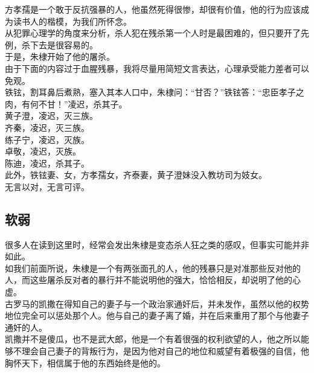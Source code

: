 \begin{multicols}{\theparacolNo}
方孝孺是一个敢于反抗强暴的人，他虽然死得很惨，却很有价值，他的行为应该成为读书人的楷模，为我们所怀念。\\

从犯罪心理学的角度来分析，杀人犯在残杀第一个人时是最困难的，但只要开了先例，杀下去是很容易的。\\

于是，朱棣开始了他的屠杀。\\

由于下面的内容过于血腥残暴，我将尽量用简短文言表达，心理承受能力差者可以免观。\\

铁铉，割耳鼻后煮熟，塞入其本人口中，朱棣问：“甘否？”铁铉答：“忠臣孝子之肉，有何不甘！”凌迟，杀其子。\\

黄子澄，凌迟，灭三族。\\

齐秦，凌迟，灭三族。\\

练子宁，凌迟，灭族。\\

卓敬，凌迟，灭族。\\

陈迪，凌迟，杀其子。\\

此外，铁铉妻、女，方孝孺女，齐泰妻，黄子澄妹没入教坊司为妓女。\\

无言以对，无言可评。\\

\subsection{软弱}
很多人在读到这里时，经常会发出朱棣是变态杀人狂之类的感叹，但事实可能并非如此。\\

如我们前面所说，朱棣是一个有两张面孔的人，他的残暴只是对准那些反对他的人，而这些屠杀反对者的暴行并不能说明他的强大，恰恰相反，却说明了他的心虚。\\

古罗马的凯撒在得知自己的妻子与一个政治家通奸后，并未发作，虽然以他的权势地位完全可以惩处那个人。他与自己的妻子离了婚，并在后来重用了那个与他妻子通奸的人。\\

凯撒并不是傻瓜，也不是武大郎，他是一个有着很强的权利欲望的人，他之所以能够不理会自己妻子的背叛行为，是因为他对自己的地位和威望有着极强的自信，他胸怀天下，相信属于他的东西始终是他的。\\


\end{multicols}
